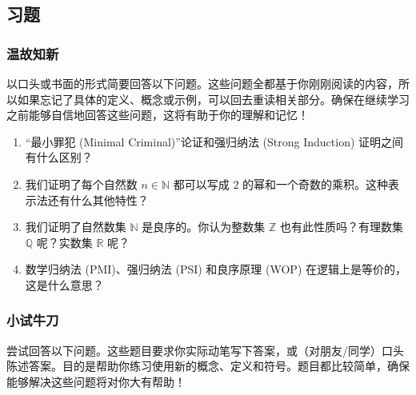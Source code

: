 \subsection{习题}

\subsubsection*{温故知新}

以口头或书面的形式简要回答以下问题。这些问题全都基于你刚刚阅读的内容，所以如果忘记了具体的定义、概念或示例，可以回去重读相关部分。确保在继续学习之前能够自信地回答这些问题，这将有助于你的理解和记忆！

\begin{enumerate}[label=(\arabic*)]
    \item ``最小罪犯 (Minimal Criminal)''论证和强归纳法 (Strong Induction) 证明之间有什么区别？
    \item 我们证明了每个自然数 $n \in \mathbb{N}$ 都可以写成 $2$ 的幂和一个奇数的乘积。这种表示法还有什么其他特性？
    \item 我们证明了自然数集 $\mathbb{N}$ 是良序的。你认为整数集 $\mathbb{Z}$ 也有此性质吗？有理数集 $\mathbb{Q}$ 呢？实数集 $\mathbb{R}$ 呢？
    \item 数学归纳法 (PMI)、强归纳法 (PSI) 和良序原理 (WOP) 在逻辑上是等价的，这是什么意思？
\end{enumerate}

\subsubsection*{小试牛刀}

尝试回答以下问题。这些题目要求你实际动笔写下答案，或（对朋友/同学）口头陈述答案。目的是帮助你练习使用新的概念、定义和符号。题目都比较简单，确保能够解决这些问题将对你大有帮助！

